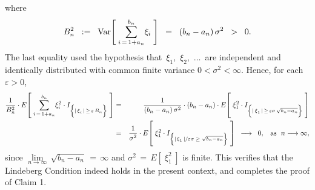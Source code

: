 \begin{enumerate}
		where
		\begin{equation*}
		B_{n}^{2}
		\;\;:=\;\; \textnormal{Var}\!\left[\;\underset{i\,=\,1+a_{n}}{\overset{b_{n}}{\sum}}\xi_{i}\;\right]
		\;\; =\;\; (b_{n} - a_{n})\,\sigma^{2} \;\;>\;\; 0.
		\end{equation*}
		The last equality used the hypothesis that \,$\xi_{1}$,\, $\xi_{2}$,\, $\ldots$\, are independent
		and identically distributed with common finite variance $0 < \sigma^{2} < \infty$.
		Hence, for each $\varepsilon > 0$,
		\begin{eqnarray*}
		\dfrac{1}{B_{n}^{2}}\cdot
		E\!\left[\;
		\underset{i\,=\,1+a_{n}}{\overset{b_{n}}{\sum}}\xi_{i}^{2}
		\cdot
		I_{\left\{\vert\,\overset{{\color{white}.}}{\xi}_{i}\,\vert\,\geq\,\varepsilon\,B_{n}\right\}}
		\;\right]
		&=&
		\dfrac{1}{(b_{n} - a_{n})\,\sigma^{2}}
		\cdot
		(b_{n}-a_{n})
		\cdot
		E\!\left[\;
		\xi_{1}^{2}
		\cdot
		I_{\left\{\vert\,\overset{{\color{white}.}}{\xi}_{1}\,\vert\,\geq\,\varepsilon\sigma\,\sqrt{b_{n}-a_{n}}\right\}}
		\;\right]
		\\	
		&=&
		\dfrac{1}{\sigma^{2}}
		\cdot
		E\!\left[\;
		\xi_{1}^{2}
		\cdot
		I_{\left\{\vert\,\overset{{\color{white}.}}{\xi}_{1}\,\vert/\varepsilon\sigma\;\geq\;\sqrt{b_{n}-a_{n}}\right\}}
		\;\right]
		\;\; \longrightarrow \;\; 0,
		\;\;\;\textnormal{as \;$n \longrightarrow \infty$},
		\end{eqnarray*}
		since $\underset{n\rightarrow\infty}{\lim}\,\sqrt{b_{n} - a_{n}} \,=\, \infty$
		\;and\; $\sigma^{2} \,=\, E\!\left[\;\xi_{1}^{2}\;\right]$ is finite.
		This verifies that the Lindeberg Condition indeed holds in the present context,
		and completes the proof of Claim 1.


\end{enumerate}
